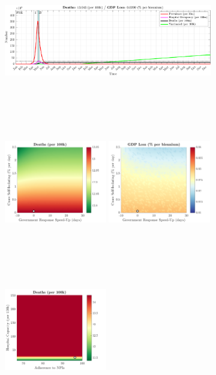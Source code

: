 \documentclass[paper=a4, fontsize=11pt]{scrartcl}
\numberwithin{figure}{section}
\numberwithin{table}{section}
\begin{document}
\begin{figure}[H]
\centering
    \begin{subfigure}[b]{\textwidth}
     	\includegraphics[width=\textwidth,height=5.5cm]{Counterfactuals/IN_swfl}
    \end{subfigure}
    \begin{subfigure}[b]{\textwidth}
      	\includegraphics[width=0.49\textwidth,height=6cm]{IN/SWINE/ero_d}
	\hspace{0.05cm}
    	\includegraphics[width=0.49\textwidth,height=6cm]{IN/SWINE/ero_g}
    \end{subfigure}
    \begin{subfigure}[b]{\textwidth}
      	\includegraphics[width=0.49\textwidth,height=6cm]{IN/SWINE/npl_d}

\end{subfigure}
\end{figure}
\end{document}
